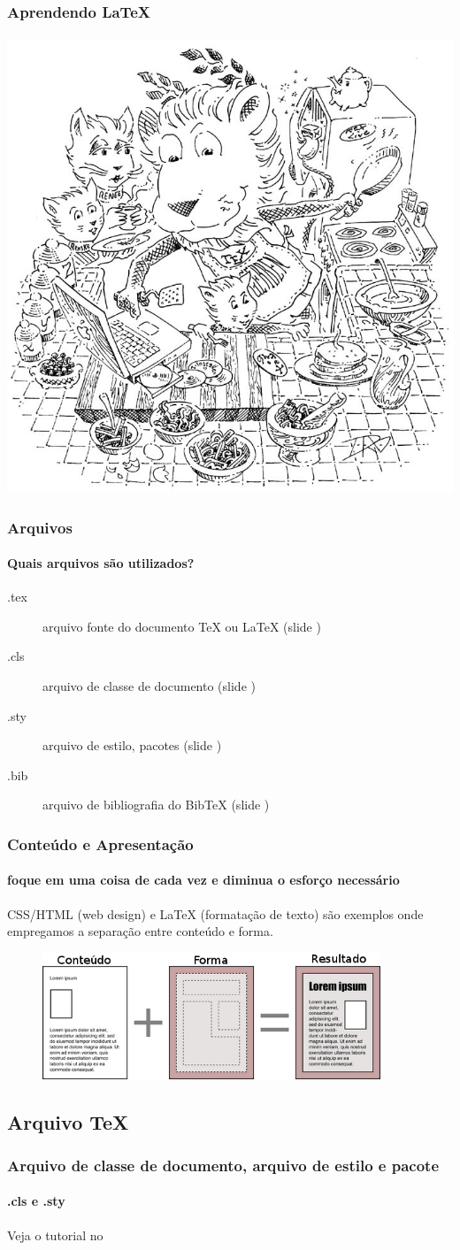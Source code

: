 \begin{frame}
\frametitle{Aprendendo \LaTeX{}}
\framesubtitle{}
\centering
\includegraphics[width=0.5\linewidth]{figures/lion02.png}
\end{frame}

\begin{frame}
\frametitle{Arquivos}
\framesubtitle{Quais arquivos são utilizados?}
\begin{description}
\item[.tex] arquivo fonte do documento \TeX{} ou \LaTeX{} (slide \pageref{sec:tex})
\item[.cls] arquivo de classe de documento (slide \pageref{clsfile})
\item[.sty] arquivo de estilo, pacotes (slide \pageref{clsfile})
\item[.bib] arquivo de bibliografia do BibTeX (slide \pageref{sec:bibtex})
\end{description}
\end{frame}

\begin{frame}
\frametitle{Conteúdo e Apresentação}
\framesubtitle{foque em uma coisa de cada vez e diminua o esforço necessário}
  CSS/HTML (web design) e \LaTeX{} (formatação de texto) são exemplos onde empregamos a separação entre conteúdo e forma.
  \begin{figure}[h!]
  \centering
  \includegraphics[width=0.9\textwidth]{figures/content_design.png}
  \label{fig:content_design}
  \end{figure}
\end{frame}


\subsection{Arquivo \TeX{}}\label{sec:tex}


\begin{frame}[label={clsfile}]
\frametitle{Arquivo de classe de documento, arquivo de estilo e pacote}
\framesubtitle{.cls e .sty}
Veja o tutorial no  
\end{frame}
